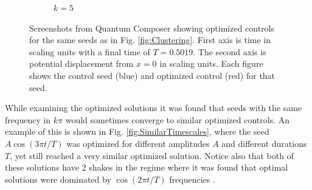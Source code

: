 \documentclass[a4paper, twocolumn]{revtex4-1}
\begin{document}
\begin{figure}
\begin{subfigure}{0.4\columnwidth}
		\caption{$k=5$}
	\end{subfigure}
	\caption{Screenshots from Quantum Composer showing  optimized controls for the same seeds as in Fig. \ref{fig:Clustering}. First axis is time in scaling units with a final time of $T=0.5019$. The second axis is potential displacement from $x=0$ in scaling units. Each figure shows the control seed (blue) and  optimized control (red) for that seed.}
	\label{fig:similarSolutions}
\end{figure}

While examining the optimized solutions it was found that seeds with the same frequency in $k\pi$ would sometimes converge to similar optimized controls. An example of this is shown in Fig. \ref{fig:SimilarTimescales}, where the seed $A\cos(3\pi t/T)$ was optimized for different amplitudes $A$ and different durations $T$, yet still reached a very similar optimized solution. Notice also that both of these solutions have 2  shakes in the regime where it was found that optimal solutions were dominated by $\cos(2\pi t/T)$ frequencies \cite{QM2Paper}.
\end{document}
